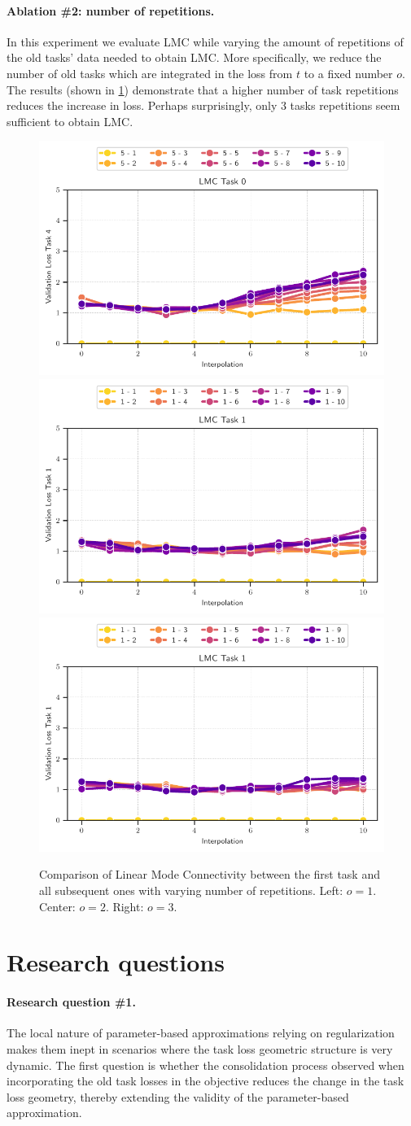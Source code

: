\documentclass{article} %
\begin{document}
\paragraph{Ablation \#2: number of repetitions.}
In this experiment we evaluate LMC while varying the amount of repetitions of the old tasks' data needed to obtain LMC. More specifically, we reduce the number of old tasks which are integrated in the loss from $t$ to a fixed number $o$. The results (shown in \cref{fig:LMC-nrt}) demonstrate that a higher number of task repetitions reduces the increase in loss. Perhaps surprisingly, only 3 tasks repetitions seem sufficient to obtain LMC.  
\begin{figure}[h!]
    \centering
    \includegraphics[width=0.3\linewidth]{figures/LMC_task_0_rt1.pdf}
    \includegraphics[width=0.3\linewidth]{figures/LMC_task_0_nrt2.pdf}
\includegraphics[width=0.3\linewidth]{figures/LMC_task_0_nrt3.pdf}
    \caption{Comparison of Linear Mode Connectivity between the first task and all subsequent ones with varying number of repetitions. Left: $o=1$. Center: $o=2$. Right: $o=3$.  }
    \label{fig:LMC-nrt}
\end{figure}

\newpage

\section{Research questions}
\label{sec:RQ}
\paragraph{Research question \#1.} The local nature of parameter-based approximations relying on regularization makes them inept in scenarios where the task loss geometric structure is very dynamic. The first question is whether the consolidation process observed when incorporating the old task losses in the objective reduces the change in the task loss geometry, thereby extending the validity of the parameter-based approximation. 
\end{document}
